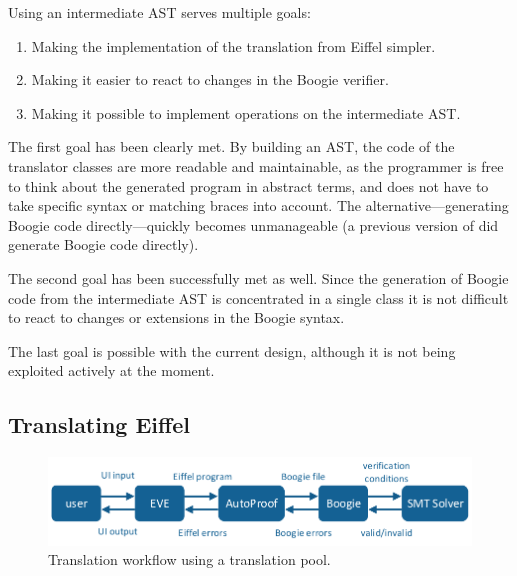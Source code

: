 Using an intermediate AST serves multiple goals:
\begin{enumerate}

\item Making the implementation of the translation from Eiffel simpler.

\item Making it easier to react to changes in the Boogie verifier.

\item Making it possible to implement operations on the intermediate AST.

\end{enumerate}

The first goal has been clearly met. By building an AST, the code of the translator classes are more readable and maintainable, as the programmer is free to think about the generated program in abstract terms, and does not have to take specific syntax or matching braces into account. The alternative---generating Boogie code directly---quickly becomes unmanageable (a previous version of \AutoProof did generate Boogie code directly).

The second goal has been successfully met as well. Since the generation of Boogie code from the intermediate AST is concentrated in a single class it is not difficult to react to changes or extensions in the Boogie syntax.

The last goal is possible with the current design, although it is not being exploited actively at the moment.


\subsection{Translating Eiffel}

\begin{figure}[!htb]
\begin{center}
\includegraphics[width=\columnwidth,page=3]{images/drawings.pdf}
\end{center}
\caption{Translation workflow using a translation pool.}
\label{fig:ap-translation-workflow}
\end{figure}

